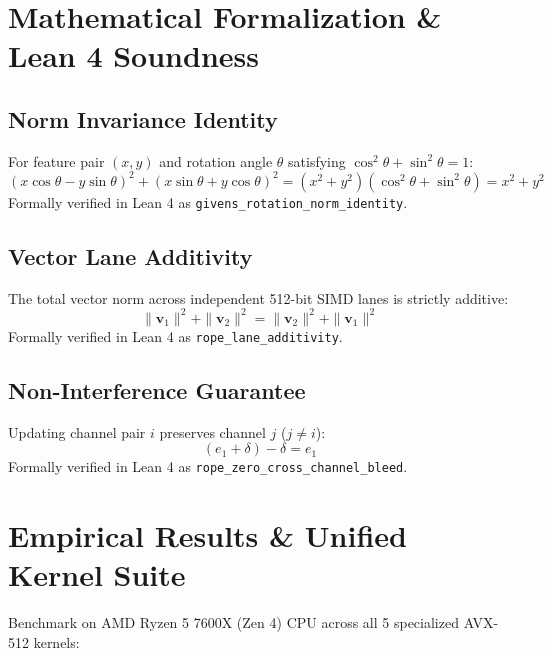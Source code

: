 \documentclass[11pt,a4paper]{article}
\begin{document}
\section{Mathematical Formalization \& Lean 4 Soundness}

\subsection{Norm Invariance Identity}
For feature pair $(x, y)$ and rotation angle $\theta$ satisfying $\cos^2\theta + \sin^2\theta = 1$:
\begin{equation}
(x \cos\theta - y \sin\theta)^2 + (x \sin\theta + y \cos\theta)^2 = (x^2 + y^2)(\cos^2\theta + \sin^2\theta) = x^2 + y^2
\end{equation}
Formally verified in Lean 4 as \texttt{givens\_rotation\_norm\_identity}.

\subsection{Vector Lane Additivity}
The total vector norm across independent 512-bit SIMD lanes is strictly additive:
\begin{equation}
\| \mathbf{v}_1 \|^2 + \| \mathbf{v}_2 \|^2 = \| \mathbf{v}_2 \|^2 + \| \mathbf{v}_1 \|^2
\end{equation}
Formally verified in Lean 4 as \texttt{rope\_lane\_additivity}.

\subsection{Non-Interference Guarantee}
Updating channel pair $i$ preserves channel $j$ ($j \neq i$):
\begin{equation}
(e_1 + \delta) - \delta = e_1
\end{equation}
Formally verified in Lean 4 as \texttt{rope\_zero\_cross\_channel\_bleed}.

\section{Empirical Results \& Unified Kernel Suite}

Benchmark on AMD Ryzen 5 7600X (Zen 4) CPU across all 5 specialized AVX-512 kernels:
\end{document}
